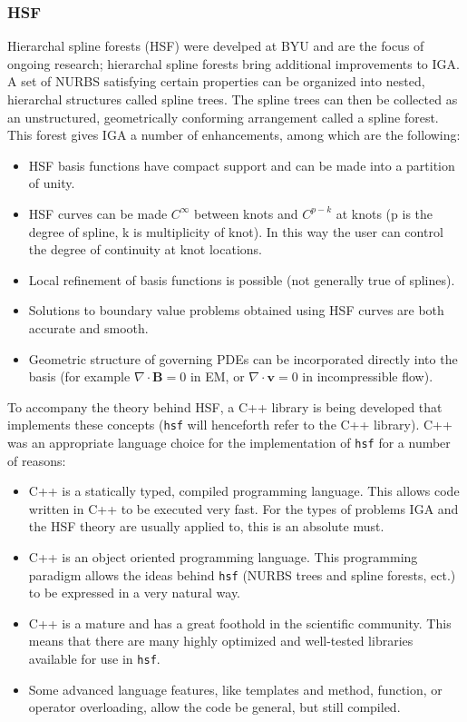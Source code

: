      \subsubsection{HSF} \label{ssub:hsfpy}

        Hierarchal spline forests (HSF) were develped at BYU and are the focus of ongoing research; hierarchal spline forests bring additional improvements to IGA. A set of NURBS satisfying certain properties can be organized into nested, hierarchal structures called spline trees.  The spline trees can then be collected as an unstructured, geometrically conforming arrangement called a spline forest. This forest gives IGA a number of enhancements, among which are the following:

    \begin{itemize}
      \item HSF basis functions have compact support and can be made into a partition of unity.
      \item HSF curves can be made $C^{\infty}$ between knots and $C^{p-k}$ at knots (p is the degree of spline, k is multiplicity of knot). In this way the user can control the degree of continuity at knot locations.
      \item Local refinement of basis functions is possible (not generally true of splines).
      \item Solutions to boundary value problems obtained using HSF curves are both accurate and smooth.
      \item Geometric structure of governing PDEs can be incorporated directly into the basis (for example $\nabla\cdot\mathbf{B} = 0$ in EM, or $\nabla\cdot\mathbf{v} = 0$ in incompressible flow).
    \end{itemize}
    \mainstretch{}

    To accompany the theory behind HSF, a C++ library is being developed that implements these concepts (\texttt{hsf} will henceforth refer to the C++ library). C++ was an appropriate language choice for the implementation of \texttt{hsf} for a number of reasons:

    \begin{itemize}
      \item C++ is a statically typed, compiled programming language. This allows code written in C++ to be executed very fast. For the types of problems IGA and the HSF theory are usually applied to, this is an absolute must.
      \item C++ is an object oriented programming language. This programming paradigm allows the ideas behind \texttt{hsf} (NURBS trees and spline forests, ect.) to be expressed in a very natural way.
      \item C++ is a mature and has a great foothold in the scientific community. This means that there are many highly optimized and well-tested libraries available for use in \texttt{hsf}.
      \item Some advanced language features, like templates and method, function, or operator overloading, allow the code be general, but still compiled.
    \end{itemize}
    \mainstretch{}

